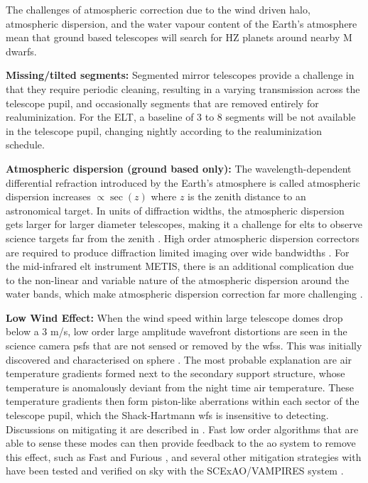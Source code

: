 \documentclass[letterpaper]{ar-1col}
\begin{document}
The challenges of atmospheric correction due to the wind driven halo, atmospheric dispersion, and the water vapour content of the Earth's atmosphere mean that ground based telescopes will search for HZ planets around nearby M dwarfs.

{\bf Missing/tilted segments:} Segmented mirror telescopes provide a challenge in that they require periodic cleaning, resulting in a varying transmission across the telescope pupil, and occasionally segments that are removed entirely for realuminization.
%
For the ELT, a baseline of 3 to 8 segments will be not available in the telescope pupil, changing nightly according to the realuminization schedule.

{\bf Atmospheric dispersion (ground based only):} The wavelength-dependent differential refraction introduced by the Earth's atmosphere is called atmospheric dispersion increases $\propto \sec(z)$ where $z$ is the zenith distance to an astronomical target.
%
In units of diffraction widths, the atmospheric dispersion gets larger for larger diameter telescopes, making it a challenge for \acp{elt} to observe science targets far from the zenith \citep{Kendrew08,Skemer09,van2020quantification}.
%
High order atmospheric dispersion correctors are required to produce diffraction limited imaging over wide bandwidths \citep{Kopon13}.
%
For the mid-infrared \ac{elt} instrument METIS, there is an additional complication due to the non-linear and variable nature of the atmospheric dispersion around the water bands, which make atmospheric dispersion correction far more challenging \citep{Absil22}.

{\bf Low Wind Effect: } When the wind speed within large telescope domes drop below a 3 m/s, low order large amplitude wavefront distortions are seen in the science camera \acp{psf} that are not sensed or removed by the \acp{wfs}.
%
This was initially discovered and characterised on \ac{sphere} \citep{Sauvage16}.
%
The most probable explanation are air temperature gradients formed next to the secondary support structure, whose temperature is anomalously deviant from the night time air temperature.
%
These temperature gradients then form piston-like aberrations within each sector of the telescope pupil, which the Shack-Hartmann \ac{wfs} is insensitive to detecting.
%
Discussions on mitigating it are described in \citet{Milli18}.
%
Fast low order algorithms that are able to sense these modes can then provide feedback to the \ac{ao} system to remove this effect, such as Fast and Furious \citep{Wilby18}, and several other mitigation strategies with have been tested and verified on sky with the SCExAO/VAMPIRES system \citep{Vievard19}.
\end{document}
